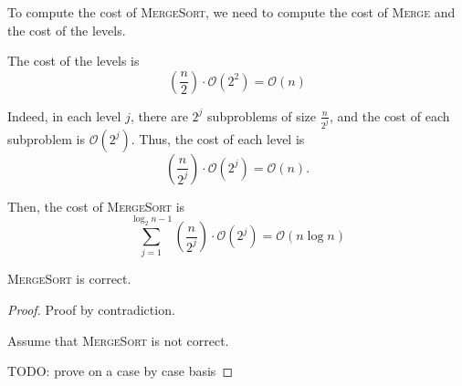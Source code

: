 To compute the cost of \textsc{MergeSort}, we need to compute the cost of \textsc{Merge} and the cost of the levels. 

\begin{claim}
    The cost of the levels is \[
        \left( \frac{n}{2} \right) \cdot \mathcal{O}(2^2) = \mathcal{O}(n)
    \]
\end{claim}

Indeed, in each level $j$, there are $2^j$ subproblems of size $\frac{n}{2^j}$, and the cost of each subproblem is $\mathcal{O}(2^j)$. Thus, the cost of each level is \[
    \left( \frac{n}{2^j} \right) \cdot \mathcal{O}(2^j) = \mathcal{O}(n).
\]

Then, the cost of \textsc{MergeSort} is \[
    \sum_{j=1}^{\log_2 n - 1} \left( \frac{n}{2^j} \right) \cdot \mathcal{O}(2^j) = \mathcal{O}(n \log n)
\]

\begin{claim}
    \textsc{MergeSort} is correct.
\end{claim}

\begin{proof}
    Proof by contradiction. 

    Assume that \textsc{MergeSort} is not correct. 

    TODO: prove on a case by case basis
\end{proof}

